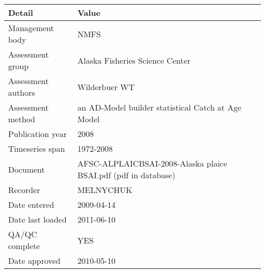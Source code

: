 \begin{table}[htb]
\centering
\begin{tabular}{lp{7cm}}
\toprule
Detail & Value \\
\midrule
Management body    & NMFS                                                           \\
Assessment group   & Alaska Fisheries Science Center                                \\
Assessment authors & Wilderbuer WT                                                  \\
Assessment method  & an AD-Model builder statistical Catch at Age Model             \\
Publication year   & 2008                                                           \\
Timeseries span    & 1972-2008                                                      \\
Document           & AFSC-ALPLAICBSAI-2008-Alaska plaice BSAI.pdf (pdf in database) \\
Recorder           & MELNYCHUK                                                      \\
Date entered       & 2009-04-14                                                     \\
Date last loaded   & 2011-06-10                                                     \\
QA/QC complete     & YES                                                            \\
Date approved      & 2010-05-10                                                     \\
\bottomrule
\end{tabular}
\label{tab:assessdet}
\end{table}
